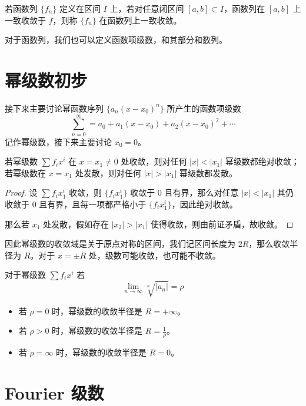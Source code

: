 \begin{definition}
	若函数列 $\{f_n\}$ 定义在区间 $I$ 上，若对任意闭区间 $[a, b] \subset I$，函数列在 $[a, b]$ 上一致收敛于 $f$，则称 $\{f_n\}$ 在函数列上一致收敛。
\end{definition}


对于函数列，我们也可以定义函数项级数，和其部分和数列。

\section{幂级数初步}

接下来主要讨论幂函数序列 $\{a_n(x- x_0)^n \}$ 所产生的函数项级数
\[ \sum_{n=0}^{\infty} = a_0 + a_1(x-x_0) + a_2(x-x_0)^2 + \cdots \]
记作幂级数，接下来主要讨论 $x_0 = 0$。

\begin{theorem}
	若幂级数 $\sum f_i x^i$ 在 $x = x_1 \neq 0$ 处收敛，则对任何 $|x| < |x_1|$ 幂级数都绝对收敛；若幂级数在 $x = x_1$ 处发散，则对任何 $|x| > |x_1|$ 幂级数都发散。
\end{theorem}

\begin{proof}
	设 $\sum f_i x_1^i$ 收敛，则 $\{f_i x_1^i\}$ 收敛于 $0$ 且有界，那么对任意 $|x| < |x_1|$ 其仍收敛于 $0$ 且有界，且每一项都严格小于 $\{f_i x_1^i\}$，因此绝对收敛。

	那么若 $x_1$ 处发散，假如存在 $|x_2| > |x_1|$ 使得收敛，则由前证矛盾，故收敛。
\end{proof}

因此幂级数的收敛域是关于原点对称的区间，我们记区间长度为 $2R$，那么收敛半径为 $R$。对于 $x = \pm R$ 处，级数可能收敛，也可能不收敛。

\begin{theorem}
	对于幂级数 $\sum f_i x^i$ 若
	\[ \lim_{n \to \infty} \sqrt[n]{|a_n|} = \rho \]
	\begin{itemize}
		\item 若 $\rho = 0$ 时，幂级数的收敛半径是 $R = +\infty$。
		\item 若 $\rho > 0$ 时，幂级数的收敛半径是 $R = \frac{1}{\rho}$。
		\item 若 $\rho = \infty$ 时，幂级数的收敛半径是 $R = 0$。
	\end{itemize}
\end{theorem}

\section{Fourier 级数}

